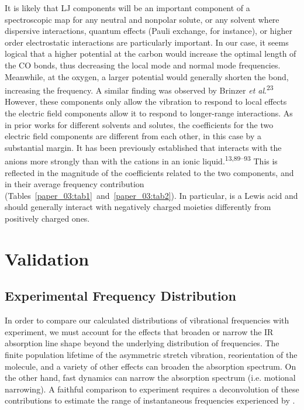 It is likely that LJ components will be an important component of a spectroscopic map for any neutral and nonpolar solute, or any solvent where dispersive interactions, quantum effects (Pauli exchange, for instance), or higher order electrostatic interactions are particularly important. In our case, it seems logical that a higher potential at the carbon would increase the optimal length of the CO bonds, thus decreasing the local mode and normal mode frequencies. Meanwhile, at the oxygen, a larger potential would generally shorten the bond, increasing the frequency. A similar finding was observed by Brinzer \emph{et al}.\textsuperscript{23} However, these components only allow the  vibration to respond to local effects \textemdash{} the electric field components allow it to respond to longer-range interactions. As in prior works for different solvents and solutes, the coefficients for the two electric field components are different from each other, in this case by a substantial margin. It has been previously established that  interacts with the anions more strongly than with the cations in an ionic liquid.\textsuperscript{13,89--93} This is reflected in the magnitude of the coefficients related to the two components, and in their average frequency contribution (Tables~\ref{paper_03:tab1}~and~\ref{paper_03:tab2}). In particular,  is a Lewis acid and should generally interact with negatively charged moieties differently from positively charged ones.

\section{Validation}
\label{paper_03:sec:V}

\subsection{Experimental Frequency Distribution}
\label{paper_03:ssec:V-A}

In order to compare our calculated distributions of  vibrational frequencies with experiment, we must account for the effects that broaden or narrow the IR absorption line shape beyond the underlying distribution of frequencies. The finite population lifetime of the asymmetric stretch vibration, reorientation of the  molecule, and a variety of other effects can broaden the absorption spectrum. On the other hand, fast dynamics can narrow the absorption spectrum (i.e. motional narrowing). A faithful comparison to experiment requires a deconvolution of these contributions to estimate the range of instantaneous frequencies experienced by .

